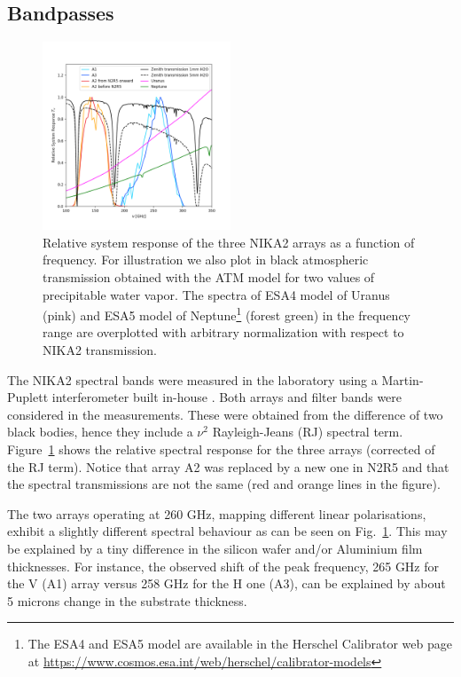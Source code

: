 \subsection{Bandpasses}
\label{se:instru_bandpass}

\begin{figure}[ht!] %
\begin{center}
\includegraphics[clip,trim={0, 1cm, 0, 2cm},width=0.5\textwidth]{Figures/bandpasses_nika2_colorsok.png}
\caption[NIKA2 transmission]{Relative system response of the three NIKA2 arrays as a
  function of frequency. For illustration we also plot in black
  atmospheric transmission obtained with the ATM model \citep{ATM,
    Pardo2002} for two values of precipitable water vapor. The spectra
  of ESA4 model of Uranus (pink) and ESA5 model of
  Neptune\footnote{The ESA4 and ESA5 model are available in the Herschel
    Calibrator web page at \url{https://www.cosmos.esa.int/web/herschel/calibrator-models}} (forest green) in the frequency range are overplotted with arbitrary normalization with respect to NIKA2 transmission.} 
 \label{spectralband1}
\end{center}
\end{figure}

The NIKA2 spectral bands were measured in the laboratory using a
Martin-Puplett interferometer built in-house \cite{durand}.  Both
arrays and filter bands were considered in the measurements. These
were obtained from the difference of two black bodies, hence they
include a $\nu^2$ Rayleigh-Jeans (RJ) spectral term.
Figure~\ref{spectralband1} shows the relative spectral response for
the three arrays (corrected of the RJ term).  Notice that array A2 was
replaced by a new one in N2R5 and that the spectral transmissions are
not the same (red and orange lines in the figure).

The two arrays operating at 260 GHz, mapping different linear polarisations,
exhibit a slightly different spectral behaviour as can be
seen on Fig.~\ref{spectralband1}. This may be explained by a tiny
difference in the silicon wafer and/or Aluminium film thicknesses. For
instance, the observed shift of the peak frequency, 265 GHz for the V
(A1) array versus 258 GHz for the H one (A3), can be explained by
about 5 microns change in the substrate thickness. 

